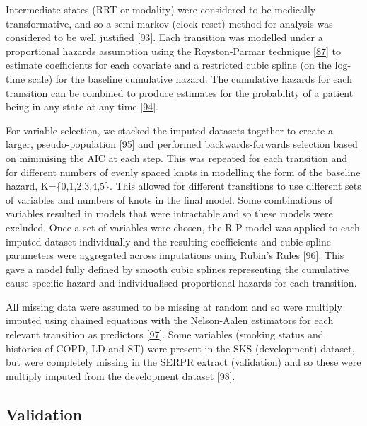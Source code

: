 \documentclass[12pt,PhD,twoside,openright]{muthesis}
\begin{document}
Intermediate states (RRT or modality) were considered to be medically transformative, and so a semi-markov (clock reset) method for analysis was considered to be well justified {[}\protect\hyperlink{ref-meira-machado_multi-state_2009}{93}{]}. Each transition was modelled under a proportional hazards assumption using the Royston-Parmar technique {[}\protect\hyperlink{ref-royston_flexible_2002}{87}{]} to estimate coefficients for each covariate and a restricted cubic spline (on the log-time scale) for the baseline cumulative hazard. The cumulative hazards for each transition can be combined to produce estimates for the probability of a patient being in any state at any time {[}\protect\hyperlink{ref-putter_tutorial_2007}{94}{]}.

For variable selection, we stacked the imputed datasets together to create a larger, pseudo-population {[}\protect\hyperlink{ref-wood_how_2008}{95}{]} and performed backwards-forwards selection based on minimising the AIC at each step. This was repeated for each transition and for different numbers of evenly spaced knots in modelling the form of the baseline hazard, K=\{0,1,2,3,4,5\}. This allowed for different transitions to use different sets of variables and numbers of knots in the final model. Some combinations of variables resulted in models that were intractable and so these models were excluded. Once a set of variables were chosen, the R-P model was applied to each imputed dataset individually and the resulting coefficients and cubic spline parameters were aggregated across imputations using Rubin's Rules {[}\protect\hyperlink{ref-rubin_multiple_1984}{96}{]}. This gave a model fully defined by smooth cubic splines representing the cumulative cause-specific hazard and individualised proportional hazards for each transition.

All missing data were assumed to be missing at random and so were multiply imputed using chained equations with the Nelson-Aalen estimators for each relevant transition as predictors {[}\protect\hyperlink{ref-white_imputing_2009}{97}{]}. Some variables (smoking status and histories of COPD, LD and ST) were present in the SKS (development) dataset, but were completely missing in the SERPR extract (validation) and so these were multiply imputed from the development dataset {[}\protect\hyperlink{ref-janssen_dealing_2009}{98}{]}.

\hypertarget{validation}{%
\subsection{Validation}\label{validation}}
\end{document}
